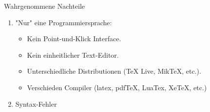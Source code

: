 





\begin{frame}{Wahrgenommene Nachteile}
	\begin{enumerate}[<+-|alert@+>]
		\item "Nur" eine Programmiersprache:
		      \begin{itemize}
                    \item Kein Point-und-Klick Interface.
                    \item Kein einheitlicher Text-Editor.
                    \item Unterschiedliche Distributionen (TeX Live, MikTeX, etc.).
                    \item Verschieden Compiler (latex, pdfTeX, LuaTex, XeTeX, etc.)
		      \end{itemize}
        \item Syntax-Fehler
	\end{enumerate}
\end{frame}
